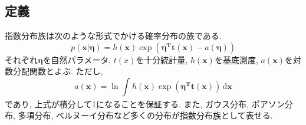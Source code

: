 \documentclass[twocolumn]{jarticle}
\begin{document}
\subsection{定義}
指数分布族は次のような形式でかける確率分布の族である.
\begin{equation}
  p(\bm {x}|\bm {\eta}) = h(\bm {x})\exp(\bm {\eta^T t(x)} - a(\bm {\eta}))
\end{equation}
それぞれ${\bm {\eta}}$を自然パラメータ, ${t(x)}$を十分統計量, ${h(\bm {x})}$を基底測度, ${a(\bm {x})}$を対数分配関数とよぶ. ただし,
\begin{equation}
  a(\bm {x}) = \ln \int_{}^{} h(\bm {x}) \exp(\bm {\eta^T t(x)} ) \,\mathrm{d}{\bm {x}}
\end{equation}
であり, 上式が積分して1になることを保証する.
また, ガウス分布, ポアソン分布, 多項分布, ベルヌーイ分布など多くの分布が指数分布族として表せる.
\end{document}
